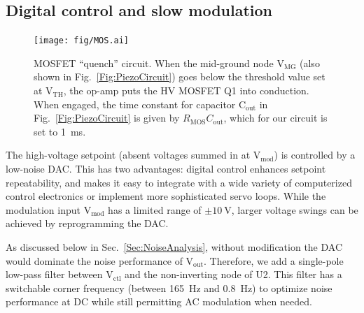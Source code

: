\documentclass[aip,rsi,reprint]{revtex4-1} %
\begin{document}
%
%

\subsection{Digital control and slow modulation}
\label{Sec:SlowModulationMOS}

\begin{figure}[t!]
\texttt{[image: fig/MOS.ai]}
\caption{MOSFET ``quench'' circuit.
When the mid-ground node $\text{V}_\text{MG}$ (also shown in Fig.~\ref{Fig:PiezoCircuit}) goes below the threshold value set at $\text{V}_\text{TH}$, the op-amp puts the HV MOSFET Q1 into conduction.
When engaged, the time constant for capacitor $\text{C}_\text{out}$ in Fig.~\ref{Fig:PiezoCircuit} is given by $R_\text{MOS} C_\text{out}$, which for our circuit is set to \SI{1}{\milli\second}.
\label{Fig:MOS}}
\end{figure}

The high-voltage setpoint (absent voltages summed in at $\text{V}_\text{mod}$) is controlled by a low-noise DAC.
This has two advantages: digital control enhances setpoint repeatability, and makes it easy to integrate with a wide variety of computerized control electronics or implement more sophisticated servo loops.
While the modulation input $\text{V}_\text{mod}$ has a limited range of $\pm\SI{10}{\volt}$, larger voltage swings can be achieved by reprogramming the DAC.

As discussed below in Sec.~\ref{Sec:NoiseAnalysis}, without modification the DAC would dominate the noise performance of $\text{V}_\text{out}$.
Therefore, we add a single-pole low-pass filter between $\text{V}_\text{ctl}$ and the non-inverting node of U2.
This filter has a switchable corner frequency (between \SI{165}{\hertz} and \SI{0.8}{\hertz}) to optimize noise performance at DC while still permitting AC modulation when needed.
\end{document}
